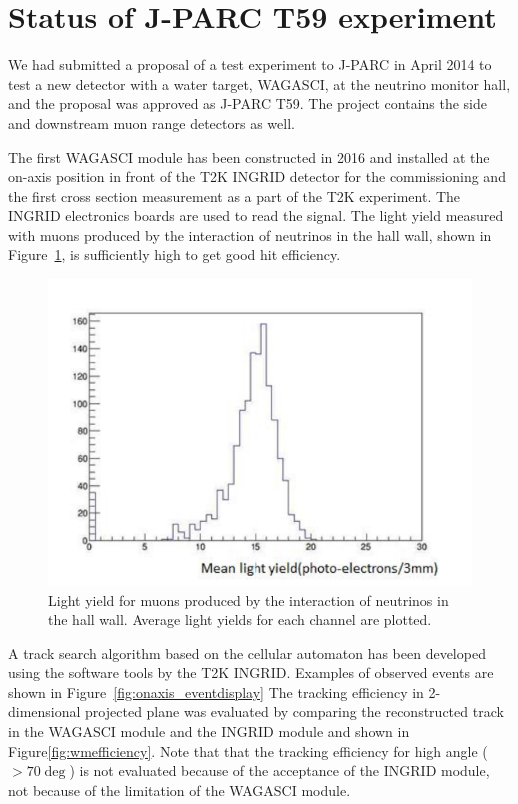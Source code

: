 \section{Status of J-PARC T59 experiment}
\label{sec:t59status}
We had submitted a proposal of a test experiment to J-PARC in April 2014 to test a new detector with a water target, WAGASCI, at the neutrino monitor hall, and the proposal was approved as J-PARC T59.
The project contains the side and downstream muon range detectors as well.

The first WAGASCI module has been constructed in 2016 and installed at the on-axis position in front of the T2K INGRID detector for the commissioning and the first cross section measurement as a part of the T2K experiment.
The INGRID electronics boards are used to read the signal.
The light yield measured with muons produced by the interaction of neutrinos
in the hall wall, shown in Figure~\ref{fig:wmlight}, is sufficiently high to get good hit efficiency.  
%
\begin{figure}[tbh]
\begin{center}
\includegraphics[width=0.5\linewidth]{fig/wmlight.pdf}
\end{center}
\caption{Light yield for muons produced by the interaction of neutrinos
  in the hall wall. Average light yields for each channel are plotted.
}
\label{fig:wmlight}
\end{figure}
A track search algorithm based on the cellular automaton has been developed using the software tools by the T2K INGRID. 
Examples of observed events are shown in Figure~\ref{fig:onaxis_eventdisplay}
The tracking efficiency in 2-dimensional projected plane was evaluated by comparing the reconstructed track
in the WAGASCI module and the INGRID module and shown in Figure\ref{fig:wmefficiency}.
Note that that the tracking efficiency for high angle ($>70\deg$) is not evaluated because of the acceptance
of the INGRID module, not because of the limitation of the WAGASCI module.
